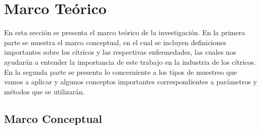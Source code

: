 \chapter{Marco Te\'{o}rico}
En esta secci\'{o}n se presenta el marco te\'{o}rico de la investigaci\'{o}n. En la primera parte se muestra el marco conceptual, en el cual se incluyen
definiciones importantes sobre los c\'{i}tricos y las respectivas enfermedades, las cuales nos ayudar\'{a}n a entender la importancia de este trabajo en la industria de los c\'{i}tricos. En la segunda parte se presenta lo concerniente a los tipos de muestreo que vamos a aplicar y algunos conceptos importantes correspondientes a par\'{a}metros y m\'{e}todos que se utilizar\'{a}n.

\section{Marco Conceptual}
